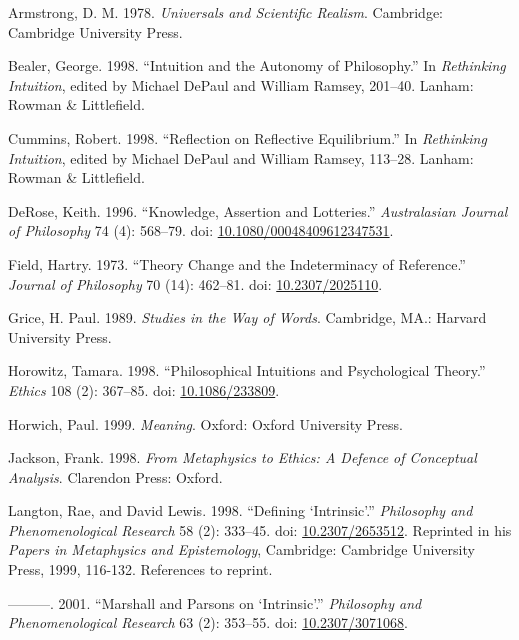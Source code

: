 \documentclass[
  11pt,
  letterpaper,
  DIV=11,
  numbers=noendperiod,
  twoside]{scrartcl}
\newlength{\cslhangindent}
\newenvironment{CSLReferences}[2] %
 {\begin{list}{}{%
  \setlength{\itemindent}{0pt}
  \setlength{\leftmargin}{0pt}
  \setlength{\parsep}{0pt}
  \ifodd #1
   \setlength{\leftmargin}{\cslhangindent}
   \setlength{\itemindent}{-1\cslhangindent}
  \fi
  \setlength{\itemsep}{#2\baselineskip}}}
 {\end{list}}
\begin{document}
\label{refs}
\begin{CSLReferences}{1}{0}
Armstrong, D. M. 1978. \emph{Universals and Scientific Realism}.
Cambridge: Cambridge University Press.

Bealer, George. 1998. {``Intuition and the Autonomy of Philosophy.''} In
\emph{Rethinking Intuition}, edited by Michael DePaul and William
Ramsey, 201--40. Lanham: Rowman \& Littlefield.

Cummins, Robert. 1998. {``Reflection on Reflective Equilibrium.''} In
\emph{Rethinking Intuition}, edited by Michael DePaul and William
Ramsey, 113--28. Lanham: Rowman \& Littlefield.

DeRose, Keith. 1996. {``Knowledge, Assertion and Lotteries.''}
\emph{Australasian Journal of Philosophy} 74 (4): 568--79. doi:
\href{https://doi.org/10.1080/00048409612347531}{10.1080/00048409612347531}.

Field, Hartry. 1973. {``Theory Change and the Indeterminacy of
Reference.''} \emph{Journal of Philosophy} 70 (14): 462--81. doi:
\href{https://doi.org/10.2307/2025110}{10.2307/2025110}.

Grice, H. Paul. 1989. \emph{Studies in the Way of Words}. Cambridge,
MA.: Harvard University Press.

Horowitz, Tamara. 1998. {``Philosophical Intuitions and Psychological
Theory.''} \emph{Ethics} 108 (2): 367--85. doi:
\href{https://doi.org/10.1086/233809}{10.1086/233809}.

Horwich, Paul. 1999. \emph{Meaning}. Oxford: Oxford University Press.

Jackson, Frank. 1998. \emph{From Metaphysics to Ethics: A Defence of
Conceptual Analysis}. Clarendon Press: Oxford.

Langton, Rae, and David Lewis. 1998. {``Defining {`Intrinsic'}.''}
\emph{Philosophy and Phenomenological Research} 58 (2): 333--45. doi:
\href{https://doi.org/10.2307/2653512}{10.2307/2653512}. Reprinted in
his \emph{Papers in Metaphysics and Epistemology}, Cambridge: Cambridge
University Press, 1999, 116-132. References to reprint.

---------. 2001. {``Marshall and {P}arsons on {`Intrinsic'}.''}
\emph{Philosophy and Phenomenological Research} 63 (2): 353--55. doi:
\href{https://doi.org/10.2307/3071068}{10.2307/3071068}.


\end{CSLReferences}
\end{document}
